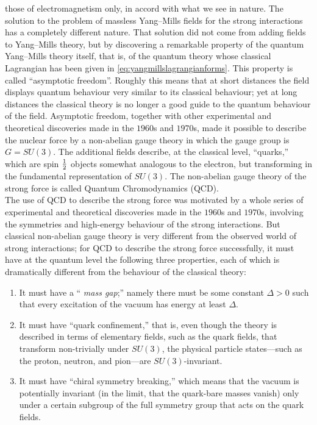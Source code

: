  those of electromagnetism only, in accord with what we see in nature.
 The solution to the problem of massless Yang–Mills fields for the strong interactions has a completely different nature. That solution did not come from
 adding fields to Yang–Mills theory, but by discovering a remarkable property of the
 quantum Yang–Mills theory itself, that is, of the quantum theory whose classical
 Lagrangian has been given in \ref{eq:yangmillslagrangianforms}. This property is called “asymptotic freedom”. Roughly this means that at short distances the field displays quantum
 behaviour very similar to its classical behaviour; yet at long distances the classical
 theory is no longer a good guide to the quantum behaviour of the field.
 Asymptotic freedom, together with other experimental and theoretical discoveries made in the $1960$s and $1970$s, made it possible to describe the nuclear force by a non-abelian gauge theory in which the gauge group is $G = SU (3)$. The additional fields describe, at the classical level, “quarks,” which are spin $\frac{1}{2}$ objects
 somewhat analogous to the electron, but transforming in the fundamental representation of $SU (3)$. The non-abelian gauge theory of the strong force is called
 Quantum Chromodynamics (QCD).\\
 The use of QCD to describe the strong force was motivated by a whole series of
 experimental and theoretical discoveries made in the $1960$s and $1970$s, involving the
 symmetries and high-energy behaviour of the strong interactions. But classical non-abelian gauge theory is very different from the observed world of strong interactions;
 for QCD to describe the strong force successfully, it must have at the quantum
 level the following three properties, each of which is dramatically different from the
 behaviour of the classical theory:
 \begin{enumerate} 
 \item  It must have a “ \emph{mass gap};” namely there must be some constant $\Delta  > 0$
 such that every excitation of the vacuum has energy at least $\Delta$.
 \item It must have “quark confinement,” that is, even though the theory is described in terms of elementary fields, such as the quark fields, that transform
 non-trivially under $SU (3)$, the physical particle states—such as the proton,
 neutron, and pion—are $SU (3)$-invariant.
 \item  It must have “chiral symmetry breaking,” which means that the vacuum is
 potentially invariant (in the limit, that the quark-bare masses vanish) only
 under a certain subgroup of the full symmetry group that acts on the quark
 fields.
\end{enumerate}
